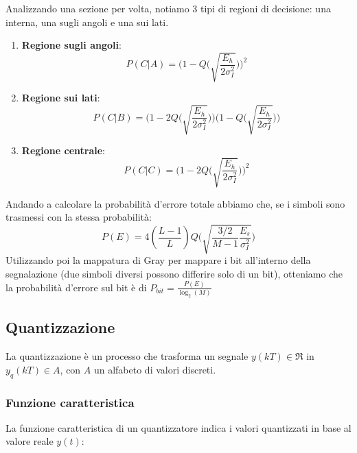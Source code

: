 \documentclass{article}
\begin{document}
Analizzando una sezione per volta, notiamo 3 tipi di regioni di decisione: una interna, una sugli angoli e una sui lati.
\begin{enumerate}
	\item \textbf{Regione sugli angoli}:$$P(C|A)=\biggl(1-Q\biggl(\sqrt{\frac{E_h}{2\sigma_I^2}}\biggl)\biggl)^2$$
	\item \textbf{Regione sui lati}:$$P(C|B)=\biggl(1-2Q\biggl(\sqrt{\frac{E_h}{2\sigma_I^2}}\biggl)\biggl)\biggl(1-Q\biggl(\sqrt{\frac{E_h}{2\sigma_I^2}}\biggl)\biggl)$$
	\item \textbf{Regione centrale}:$$P(C|C)=\biggl(1-2Q\biggl(\sqrt{\frac{E_h}{2\sigma_I^2}}\biggl)\biggl)^2$$
\end{enumerate}
Andando a calcolare la probabilità d'errore totale abbiamo che, se i simboli sono trasmessi con la stessa probabilità:
$$P(E)=4(\frac{L-1}{L})Q\biggl(\sqrt{\frac{3/2}{M-1}\frac{E_s}{\sigma_I^2}}\biggl)$$
Utilizzando poi la mappatura di Gray per mappare i bit all'interno della segnalazione (due simboli diversi possono differire solo di un bit), otteniamo che la probabilità d'errore sul bit è di $P_{bit}=\frac{P(E)}{\log_2(M)}$

\subsection{Quantizzazione}
La quantizzazione è un processo che trasforma un segnale $y(kT)\in\Re$ in $y_q(kT)\in A$, con $A$ un alfabeto di valori discreti.

\subsubsection{Funzione caratteristica}
La funzione caratteristica di un quantizzatore indica i valori quantizzati in base al valore reale $y(t)$:
\begin{center}
\end{center}
\end{document}
